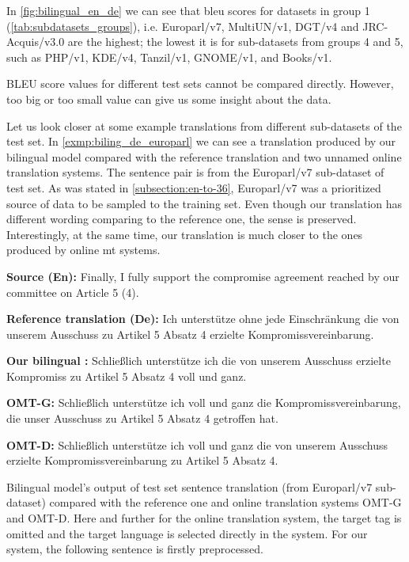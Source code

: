 In \cref{fig:bilingual_en_de} we can see that \acrshort{bleu} scores
for datasets in group 1 (\cref{tab:subdatasets_groups}), i.e.
Europarl/v7, MultiUN/v1, DGT/v4 and JRC-Acquis/v3.0 are the highest;
the lowest it is for sub-datasets from groups 4 and 5, such as
PHP/v1, KDE/v4, Tanzil/v1, GNOME/v1, and Books/v1.

BLEU score values for different test sets cannot be compared directly.
However, too big or too small value can give us some insight about the
data.

Let us look closer at some example translations from different
sub-datasets of the  test set.
In \cref{exmp:biling_de_europarl} we can see a translation produced
by our bilingual  model compared with the reference translation
and two unnamed online translation systems.
The sentence pair is from the Europarl/v7 sub-dataset of
 test set.
As was stated in \cref{subsection:en-to-36}, Europarl/v7 was a prioritized
source of data to be sampled to the training set.
Even though our translation has different wording comparing to the reference one,
the sense is preserved.
Interestingly, at the same time, our translation is much closer
to the ones produced by online \acrshort{mt} systems.

\vspace{\baselineskip}
\begin{minipage}[t]{0.9\textwidth}

\textbf{Source (En):}   Finally, I fully support the compromise agreement reached by our committee on Article 5 (4).

\textbf{Reference translation (De):}
Ich unterstütze ohne jede Einschränkung die von unserem Ausschuss
zu Artikel 5 Absatz 4 erzielte Kompromissvereinbarung.

\textbf{Our bilingual :}
Schließlich unterstütze ich die von unserem Ausschuss erzielte
Kompromiss zu Artikel 5 Absatz 4 voll und ganz.

\textbf{OMT-G:}
Schließlich unterstütze ich voll und ganz die Kompromissvereinbarung,
die unser Ausschuss zu Artikel 5 Absatz 4 getroffen hat.

\textbf{OMT-D:}
Schließlich unterstütze ich voll und ganz die von unserem Ausschuss
erzielte Kompromissvereinbarung zu Artikel 5 Absatz 4.

	\begin{exmp}
	Bilingual  model's output of test set sentence
	translation (from Europarl/v7 sub-dataset)
	compared with the reference one and online
	translation systems OMT-G and OMT-D.
	Here and further for the online translation system, the target
	tag is omitted and the target language is selected directly
	in the system.
	For our system, the following sentence is firstly preprocessed.
	\label{exmp:biling_de_europarl}
	\end{exmp}

\end{minipage}
\vspace{\baselineskip}


